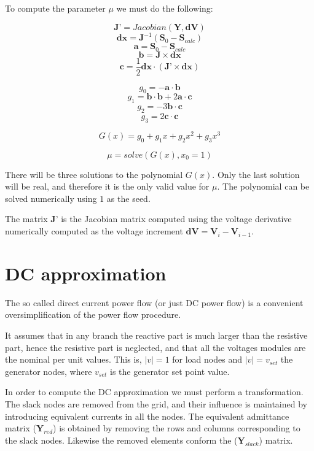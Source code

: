 \documentclass[11pt,fleqn]{book} %
\begin{document}
To compute the parameter $\mu$ we must do the following:

\begin{theorem}[Computation of $\mu$]
$$\textbf{J'} = Jacobian(\textbf{Y}, \textbf{dV})$$
$$\textbf{dx} = \textbf{J}^{-1}(\textbf{S}_0 - \textbf{S}_{calc})$$
$$\textbf{a} = \textbf{S}_0 - \textbf{S}_{calc}$$
$$\textbf{b} = \textbf{J} \times \textbf{dx}$$
$$\textbf{c} = \frac{1}{2} \textbf{dx} \cdot (\textbf{J'} \times \textbf{dx})$$

$$g_0 = -\textbf{a} \cdot \textbf{b}$$
$$g_1 = \textbf{b} \cdot \textbf{b} + 2  \textbf{a} \cdot \textbf{c}$$
$$g_2 = -3  \textbf{b} \cdot \textbf{c}$$
$$g_3 = 2  \textbf{c} \cdot \textbf{c}$$

$$G(x) = g_0 + g_1x + g_2x^2 + g_3x^3$$

$$\mu = solve(G(x), x_0=1)$$
\end{theorem}


There will be three solutions to the polynomial $G(x)$. Only the last solution will be real, and therefore it is the only valid value for $\mu$.
The polynomial can be solved numerically using $1$ as the seed.

The matrix $\textbf{J'}$ is the Jacobian matrix computed using the voltage derivative numerically computed as the voltage increment $\textbf{dV}= \textbf{V}_{i} - \textbf{V}_{i-1}$.  

\newpage
\section{DC approximation}

The so called direct current power flow (or just DC power flow) is a convenient oversimplification of the power flow procedure.

It assumes that in any branch the reactive part is much larger than the resistive part, hence the resistive part is neglected, and that all the voltages modules are the nominal per unit values. This is, $|v|=1$ for load nodes and $|v|=v_{set}$ the generator nodes, where $v_{set}$ is the generator set point value.

In order to compute the DC approximation we must perform a transformation. The slack nodes are removed from the grid, and their influence is maintained by introducing equivalent currents in all the nodes. The equivalent admittance matrix ($\textbf{Y}_{red}$) is obtained by removing the rows and columns corresponding to the slack nodes. Likewise the removed elements conform the ($\textbf{Y}_{slack}$) matrix.
\end{document}
